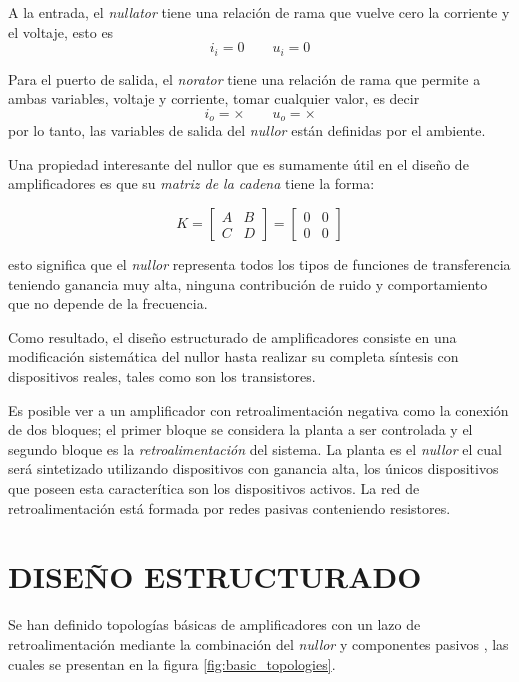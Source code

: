 \documentclass[10pt,twocolumn,twoside,letterpaper]{IEEEtran}
\begin{document}
{\vspace{-15mm}

A la entrada, el {\it nullator} tiene una relaci\'on de rama que vuelve cero la corriente y el voltaje, esto es $$i_i=0 \qquad u_i=0$$

Para el puerto de salida, el {\it norator} tiene una relaci\'on de rama que permite a ambas variables, voltaje y corriente, tomar cualquier valor, es decir $$i_o={\times} \qquad u_o={\times}$$ por lo tanto, las variables de salida del {\it nullor} est\'an definidas por el ambiente.

Una propiedad interesante del nullor que es sumamente \'util en el dise\~no de amplificadores es que su {\it matriz de la cadena} tiene la forma:

\begin{scriptsize}\begin{equation}
K=
\left[\begin{array}{cc}
A&B\\
C&D
\end{array} \right]=
\left[\begin{array}{cc}
0&0\\
0&0
\end{array} \right]
\end{equation}\end{scriptsize}

{\noindent esto significa que el {\it nullor} representa todos los tipos de funciones de transferencia teniendo ganancia muy alta, ninguna contribuci\'on de ruido y comportamiento que no depende de la frecuencia.}

Como resultado, el dise\~no estructurado de amplificadores consiste en una modificaci\'on sistem\'atica del nullor hasta realizar su completa s\'intesis con dispositivos reales, tales como son los transistores.

Es posible ver a un amplificador con retroalimentaci\'on negativa como la conexi\'on de dos bloques; el primer bloque se considera la planta a ser controlada y el segundo bloque es la {\it retroalimentaci\'on} del sistema. La planta es el {\it nullor} el cual ser\'a sintetizado utilizando dispositivos con ganancia alta, los \'unicos dispositivos que poseen esta caracter\'itica son los dispositivos activos. La red de retroalimentaci\'on est\'a formada por redes pasivas conteniendo resistores. 

\section{\textbf{DISE\~NO ESTRUCTURADO}}
Se han definido topolog\'ias b\'asicas de amplificadores con un lazo de retroalimentaci\'on mediante la combinaci\'on del {\it nullor} y componentes pasivos \cite{verhoeven,stoffels}, las cuales se presentan en la figura \ref{fig:basic_topologies}.

}
\end{document}
